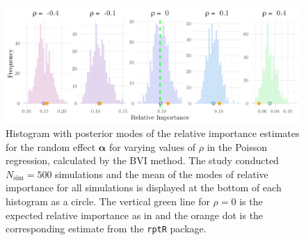 \begin{figure}[H]
  \centering
    \includegraphics[width=1\linewidth]{Figures/Simulation study/Random_poisson.png}
    \caption[Relative importance of the random effect $\boldsymbol{\alpha}$ in Poisson GLMM]{Histogram with posterior modes of the relative importance estimates for the random effect $\boldsymbol{\alpha}$ for varying values of $\rho$ in the Poisson regression, calculated by the BVI method. The study conducted $N_{\text{sim}}=500$ simulations and the mean of the modes of relative importance for all simulations is displayed at the bottom of each histogram as a circle. The vertical green line for $\rho=0$ is the expected relative importance as in  and the orange dot is the corresponding estimate from the \texttt{rptR} package.}
    \label{fig:relimp_random_poisson}
\end{figure}
